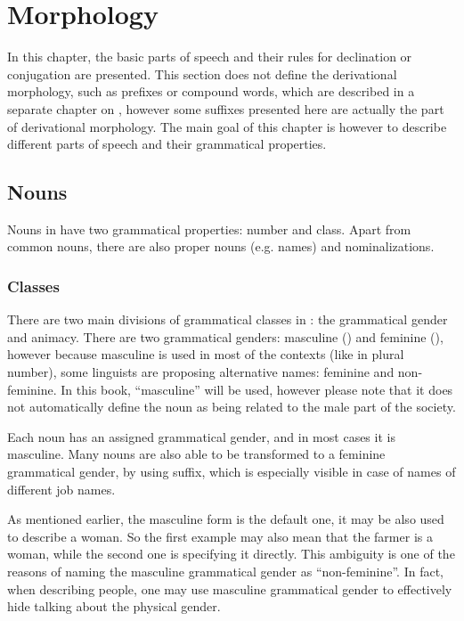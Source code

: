 \chapter{Morphology}
\label{ch:morphology}

In this chapter, the basic parts of speech and their rules for declination or
conjugation are presented. This section does not define the derivational
morphology, such as prefixes or compound words, which are described in a
separate chapter on , however some suffixes presented
here are actually the part of derivational morphology. The main goal of this
chapter is however to describe different parts of speech and their grammatical
properties.

\section{Nouns}
\label{sec:morph-nouns}

Nouns in \andro have two grammatical properties: number and class. Apart from
common nouns, there are also proper nouns (e.g. names) and nominalizations.

\subsection{Classes}

There are two main divisions of grammatical classes in \andro: the grammatical
gender and animacy. There are two grammatical genders: masculine (\M{}) and
feminine (\F{}), however because masculine is used in most of the contexts (like
in plural number), some linguists are proposing alternative names: feminine and
non-feminine. In this book, ``masculine'' will be used, however please note that
it does not automatically define the noun as being related to the male part of
the society.

Each noun has an assigned grammatical gender, and in most cases it is masculine.
Many nouns are also able to be transformed to a feminine grammatical gender, by
using  suffix, which is especially visible in case of names of different
job names.


As mentioned earlier, the masculine form is the default one, it may be also used
to describe a woman. So the first example may also mean that the farmer is a
woman, while the second one is specifying it directly. This ambiguity is one of
the reasons of naming the masculine grammatical gender as ``non-feminine''. In
fact, when describing people, one may use masculine grammatical gender to
effectively hide talking about the physical gender.


